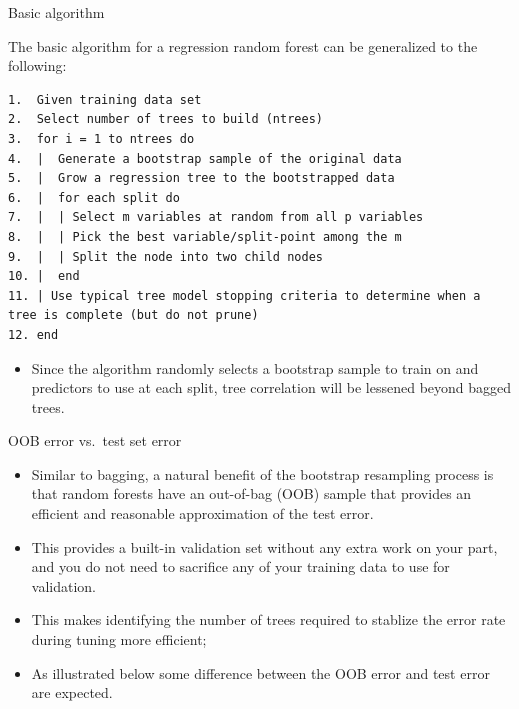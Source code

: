 \documentclass[10pt,ignorenonframetext,]{beamer}
\providecommand{\tightlist}{%
  \setlength{\itemsep}{0pt}\setlength{\parskip}{0pt}}
\begin{document}
\begin{frame}[fragile]{Basic algorithm}

The basic algorithm for a regression random forest can be generalized to
the following:

\begin{verbatim}
1.  Given training data set
2.  Select number of trees to build (ntrees)
3.  for i = 1 to ntrees do
4.  |  Generate a bootstrap sample of the original data
5.  |  Grow a regression tree to the bootstrapped data
6.  |  for each split do
7.  |  | Select m variables at random from all p variables
8.  |  | Pick the best variable/split-point among the m
9.  |  | Split the node into two child nodes
10. |  end
11. | Use typical tree model stopping criteria to determine when a tree is complete (but do not prune)
12. end
\end{verbatim}

\begin{itemize}
\tightlist
\item
  Since the algorithm randomly selects a bootstrap sample to train on
  and predictors to use at each split, tree correlation will be lessened
  beyond bagged trees.
\end{itemize}

\end{frame}

\begin{frame}{OOB error vs.~test set error}

\begin{itemize}
\tightlist
\item
  Similar to bagging, a natural benefit of the bootstrap resampling
  process is that random forests have an out-of-bag (OOB) sample that
  provides an efficient and reasonable approximation of the test error.
\item
  This provides a built-in validation set without any extra work on your
  part, and you do not need to sacrifice any of your training data to
  use for validation.
\item
  This makes identifying the number of trees required to stablize the
  error rate during tuning more efficient;
\item
  As illustrated below some difference between the OOB error and test
  error are expected.
\end{itemize}

\end{frame}
\end{document}
